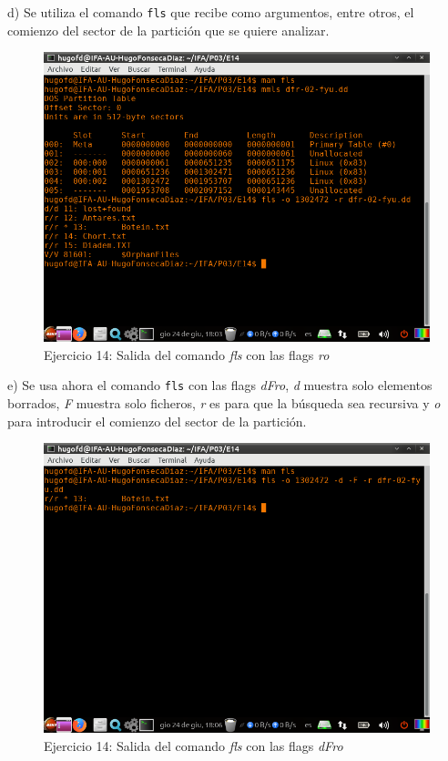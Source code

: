 \documentclass[11pt]{article}
\begin{document}
d) Se utiliza el comando \verb|fls| que recibe como argumentos, entre otros, el comienzo del sector de la partición que se quiere analizar.

\begin{figure}[H]
    \caption{Ejercicio 14: Salida del comando \textit{fls} con las flags \textit{ro}}
    \centering
    \includegraphics[scale=0.7]{p03/e14-3.png}
\end{figure}

e) Se usa ahora el comando \verb|fls| con las flags \textit{dFro}, \textit{d} muestra solo elementos borrados, \textit{F} muestra solo ficheros, \textit{r} es para que la búsqueda sea recursiva y \textit{o} para introducir el comienzo del sector de la partición.

\begin{figure}[H]
    \caption{Ejercicio 14: Salida del comando \textit{fls} con las flags \textit{dFro}}
    \centering
    \includegraphics[scale=0.7]{p03/e14-4.png}
\end{figure}
\end{document}

